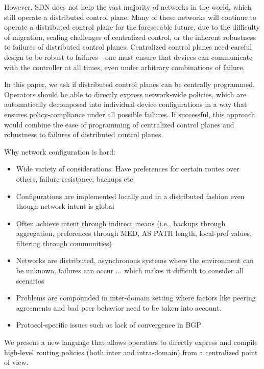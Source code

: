 However, SDN does not help the vast majority of networks in the world, which  still operate a distributed control plane. Many of these networks will continue to operate a distributed control plane for the foreseeable future, due to the difficulty of migration, scaling challenges of centralized control, or the inherent robustness to failures of distributed control planes. Centralized control planes need careful design to be robust to failures---one must ensure that devices can communicate with the controller at all times, even under arbitrary combinations of failure.

In this paper, we ask if distributed control planes can be centrally programmed. Operators should be able to directly express network-wide policies, which are automatically decomposed into individual device configurations in a way that ensures policy-compliance under all possible failures. If successful, this approach would combine the ease of programming of centralized control planes and robustness to failures of distributed control planes.



Why network configuration is hard:
\begin{itemize}
	\item Wide variety of considerations: Have preferences for certain routes over others, failure resistance, backups etc
	\item Configurations are implemented locally and in a distributed fashion even though network intent is global
	\item Often achieve intent through indirect means (i.e., backups through aggregation, preferences through MED, AS PATH length, local-pref values, filtering through communities)
	\item Networks are distributed, asynchronous systems where the environment can be unknown, failures can occur ... which makes it difficult to consider all scenarios
	\item Problems are compounded in inter-domain setting where factors like peering agreements and bad peer behavior need to be taken into account.
	\item Protocol-specific issues such as lack of convergence in BGP
\end{itemize}

We present a new language that allows operators to directly express and compile high-level routing policies (both inter and intra-domain) from a centralized point of view.

